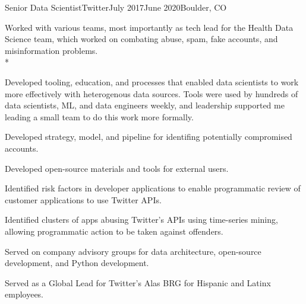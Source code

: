 \documentclass[print]{friggeri-cv} %
\begin{document}
\begin{job}
  {\twittericon}{Senior Data Scientist}{Twitter}{July 2017}{June 2020}{Boulder, CO}{
    Worked with various teams, most importantly as tech lead for the Health Data Science team,
    which worked on combating abuse, spam, fake accounts, and misinformation problems.\\*
    \begin{myitemize}
      \item Developed tooling, education, and processes that enabled data
      scientists to work more effectively with heterogenous data sources. Tools
      were used by hundreds of data scientists, ML, and data engineers weekly,
      and leadership supported me leading a small team to do this work more
      formally.
      
      \item Developed strategy, model, and pipeline for identifing potentially
      compromised accounts.
      
      \item Developed open-source materials and tools for external
      users.\autocite{search_tweets_python} \autocite{do_more_with_twitter_data}
      
      \item Identified risk factors in developer applications to enable
      programmatic review of customer applications to use Twitter APIs.
      
      \item Identified clusters of apps abusing Twitter's APIs using time-series
      mining, allowing programmatic action to be taken against offenders.
      
      \item Served on company advisory groups for data architecture, open-source
      development, and Python development.
      
      \item Served as a Global Lead for Twitter's Alas BRG for Hispanic and
      Latinx employees.

    \end{myitemize}
  }
\end{job}
\end{document}
